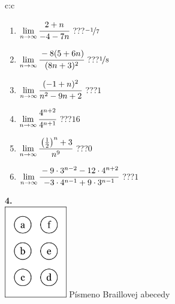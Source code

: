 \documentclass[10pt]{report}
\begin{document}
\begin{tabular}{c:c}
\begin{minipage}[c][104.5mm][t]{0.5\linewidth}
\begin{center}
\begin{minipage}{0.79\linewidth}
\begin{center}
\begin{varwidth}{\linewidth}
\begin{enumerate}
\normalsize
\item $\lim\limits_{n\to\infty}\cfrac{2+n}{-4-7n}$\quad \dotfill\; ???\;\dotfill \quad $\nicefrac{-1}{7}$
\item $\lim\limits_{n\to\infty}\cfrac{-8(5+6n)}{(8n+3)^2}$\quad \dotfill\; ???\;\dotfill \quad $\nicefrac{1}{8}$
\item $\lim\limits_{n\to\infty}\cfrac{(-1+n)^2}{n^2-9n+2}$\quad \dotfill\; ???\;\dotfill \quad $1$
\item $\lim\limits_{n\to\infty}\cfrac{4^{n+2}}{4^{n+1}}$\quad \dotfill\; ???\;\dotfill \quad $16$
\item $\lim\limits_{n\to\infty}\cfrac{\left(\frac{1}{2}\right)^n +3}{n^{9}}$\quad \dotfill\; ???\;\dotfill \quad $0$
\item $\lim\limits_{n\to\infty}\cfrac{-9\cdot 3^{n-2}-12\cdot 4^{n+2}}{-3\cdot 4^{n-1}+9\cdot 3^{n-1}}$\quad \dotfill\; ???\;\dotfill \quad $1$
\end{enumerate}
\end{varwidth}
\end{center}
\end{minipage}
\begin{minipage}{0.20\linewidth}
\begin{center}
{\Huge\bfseries 4.} \\[2mm]
\includegraphics[height=40mm]{../images/braille.png}
{\small Písmeno Braillovej abecedy}
\end{center}
\end{minipage}
\end{center}
\end{minipage}
%
\end{tabular}
\newpage
\thispagestyle{empty}
\end{document}
